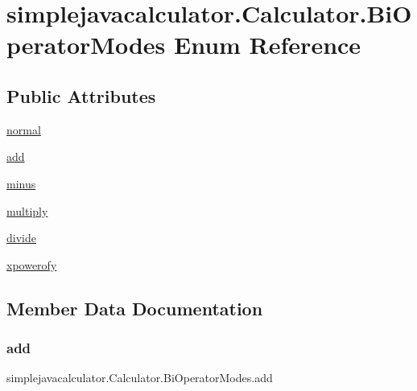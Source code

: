 \hypertarget{enumsimplejavacalculator_1_1_calculator_1_1_bi_operator_modes}{}\section{simplejavacalculator.\+Calculator.\+Bi\+Operator\+Modes Enum Reference}
\label{enumsimplejavacalculator_1_1_calculator_1_1_bi_operator_modes}
\subsection*{Public Attributes}
\begin{DoxyCompactItemize}
\item 
\mbox{\hyperlink{enumsimplejavacalculator_1_1_calculator_1_1_bi_operator_modes_a56133d3ae106bb392daf0ef835b6068a}{normal}}
\item 
\mbox{\hyperlink{enumsimplejavacalculator_1_1_calculator_1_1_bi_operator_modes_af4f0d7e0e83c48c7c10d0f33cde39d0a}{add}}
\item 
\mbox{\hyperlink{enumsimplejavacalculator_1_1_calculator_1_1_bi_operator_modes_abfa4c9df06df3125622d908eee309a63}{minus}}
\item 
\mbox{\hyperlink{enumsimplejavacalculator_1_1_calculator_1_1_bi_operator_modes_abd83bb43009ca76032ee3625ece39e66}{multiply}}
\item 
\mbox{\hyperlink{enumsimplejavacalculator_1_1_calculator_1_1_bi_operator_modes_aaa2c51c7293a0494a0def9949e601fbe}{divide}}
\item 
\mbox{\hyperlink{enumsimplejavacalculator_1_1_calculator_1_1_bi_operator_modes_a76a04cd587b521a7cea7acc8b1d6c0de}{xpowerofy}}
\end{DoxyCompactItemize}


\subsection{Member Data Documentation}
\mbox{\label{enumsimplejavacalculator_1_1_calculator_1_1_bi_operator_modes_af4f0d7e0e83c48c7c10d0f33cde39d0a}} 
\subsubsection{\texorpdfstring{add}{add}}
{\footnotesize\ttfamily simplejavacalculator.\+Calculator.\+Bi\+Operator\+Modes.\+add}

